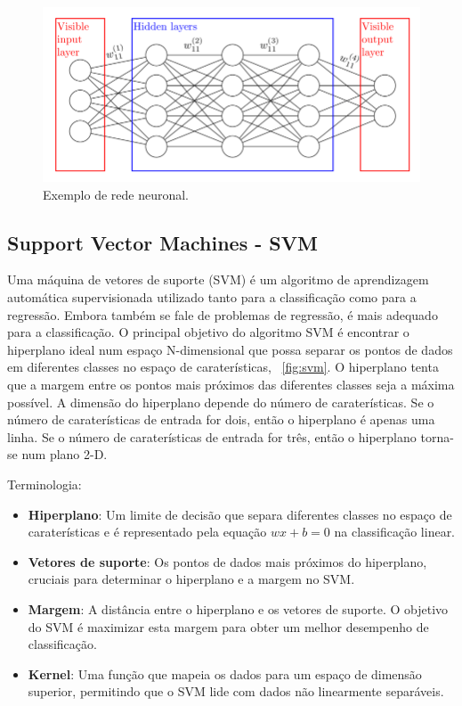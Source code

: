 \documentclass[conference]{IEEEtran}
\begin{document}
\begin{figure}
	\centering
	\includegraphics[width=0.7\linewidth]{NN}
	\caption{Exemplo de rede neuronal.}
	\label{fig:nn}
\end{figure}



\subsection{Support Vector Machines - SVM}

Uma máquina de vetores de suporte (SVM) é um algoritmo de aprendizagem automática supervisionada utilizado tanto para a classificação como para a regressão. Embora também se fale de problemas de regressão, é mais adequado para a classificação. O principal objetivo do algoritmo SVM é encontrar o hiperplano ideal num espaço N-dimensional que possa separar os pontos de dados em diferentes classes no espaço de caraterísticas, \figurename~\ref{fig:svm}. O hiperplano tenta que a margem entre os pontos mais próximos das diferentes classes seja a máxima possível. A dimensão do hiperplano depende do número de caraterísticas. Se o número de caraterísticas de entrada for dois, então o hiperplano é apenas uma linha. Se o número de caraterísticas de entrada for três, então o hiperplano torna-se num plano 2-D. \cite{madureira2024svm}

Terminologia:

\begin{itemize}
	\item \textbf{Hiperplano}: Um limite de decisão que separa diferentes classes no espaço de caraterísticas e é representado pela equação $wx + b = 0$ na classificação linear.
	
	\item \textbf{Vetores de suporte}: Os pontos de dados mais próximos do hiperplano, cruciais para determinar o hiperplano e a margem no SVM.
	
	\item \textbf{Margem}: A distância entre o hiperplano e os vetores de suporte. O objetivo do SVM é maximizar esta margem para obter um melhor desempenho de classificação.
	
	\item \textbf{Kernel}: Uma função que mapeia os dados para um espaço de dimensão superior, permitindo que o SVM lide com dados não linearmente separáveis. \cite{madureira2024svm}
\end{itemize}
\end{document}
